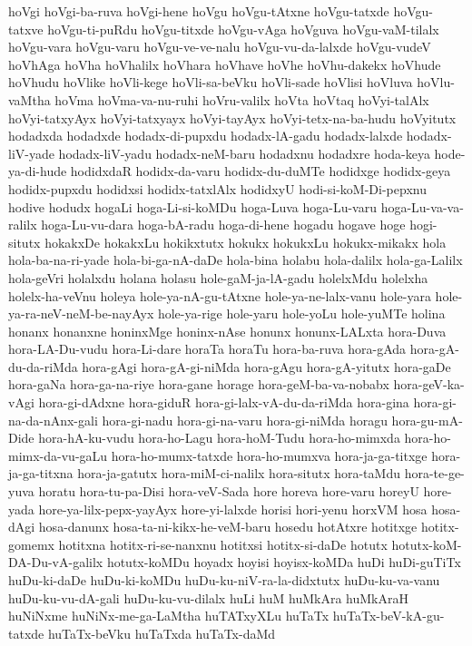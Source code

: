 {hoVgi
hoVgi-ba-ruva
hoVgi-hene
hoVgu
hoVgu-tAtxne
hoVgu-tatxde
hoVgu-tatxve
hoVgu-ti-puRdu
hoVgu-titxde
hoVgu-vAga
hoVguva
hoVgu-vaM-tilalx
hoVgu-vara
hoVgu-varu
hoVgu-ve-ve-nalu
hoVgu-vu-da-lalxde
hoVgu-vudeV
hoVhAga
hoVha
hoVhalilx
hoVhara
hoVhave
hoVhe
hoVhu-dakekx
hoVhude
hoVhudu
hoVlike
hoVli-kege
hoVli-sa-beVku
hoVli-sade
hoVlisi
hoVluva
hoVlu-vaMtha
hoVma
hoVma-va-nu-ruhi
hoVru-valilx
hoVta
hoVtaq
hoVyi-talAlx
hoVyi-tatxyAyx
hoVyi-tatxyayx
hoVyi-tayAyx
hoVyi-tetx-na-ba-hudu
hoVyitutx
hodadxda
hodadxde
hodadx-di-pupxdu
hodadx-lA-gadu
hodadx-lalxde
hodadx-liV-yade
hodadx-liV-yadu
hodadx-neM-baru
hodadxnu
hodadxre
hoda-keya
hode-ya-di-hude
hodidxdaR
hodidx-da-varu
hodidx-du-duMTe
hodidxge
hodidx-geya
hodidx-pupxdu
hodidxsi
hodidx-tatxlAlx
hodidxyU
hodi-si-koM-Di-pepxnu
hodive
hodudx
hogaLi
hoga-Li-si-koMDu
hoga-Luva
hoga-Lu-varu
hoga-Lu-va-va-ralilx
hoga-Lu-vu-dara
hoga-bA-radu
hoga-di-hene
hogadu
hogave
hoge
hogi-situtx
hokakxDe
hokakxLu
hokikxtutx
hokukx
hokukxLu
hokukx-mikakx
hola
hola-ba-na-ri-yade
hola-bi-ga-nA-daDe
hola-bina
holabu
hola-dalilx
hola-ga-Lalilx
hola-geVri
holalxdu
holana
holasu
hole-gaM-ja-lA-gadu
holelxMdu
holelxha
holelx-ha-veVnu
holeya
hole-ya-nA-gu-tAtxne
hole-ya-ne-lalx-vanu
hole-yara
hole-ya-ra-neV-neM-be-nayAyx
hole-ya-rige
hole-yaru
hole-yoLu
hole-yuMTe
holina
honanx
honanxne
honinxMge
honinx-nAse
honunx
honunx-LALxta
hora-Duva
hora-LA-Du-vudu
hora-Li-dare
horaTa
horaTu
hora-ba-ruva
hora-gAda
hora-gA-du-da-riMda
hora-gAgi
hora-gA-gi-niMda
hora-gAgu
hora-gA-yitutx
hora-gaDe
hora-gaNa
hora-ga-na-riye
hora-gane
horage
hora-geM-ba-va-nobabx
hora-geV-ka-vAgi
hora-gi-dAdxne
hora-giduR
hora-gi-lalx-vA-du-da-riMda
hora-gina
hora-gi-na-da-nAnx-gali
hora-gi-nadu
hora-gi-na-varu
hora-gi-niMda
horagu
hora-gu-mA-Dide
hora-hA-ku-vudu
hora-ho-Lagu
hora-hoM-Tudu
hora-ho-mimxda
hora-ho-mimx-da-vu-gaLu
hora-ho-mumx-tatxde
hora-ho-mumxva
hora-ja-ga-titxge
hora-ja-ga-titxna
hora-ja-gatutx
hora-miM-ci-nalilx
hora-situtx
hora-taMdu
hora-te-ge-yuva
horatu
hora-tu-pa-Disi
hora-veV-Sada
hore
horeva
hore-varu
horeyU
hore-yada
hore-ya-lilx-pepx-yayAyx
hore-yi-lalxde
horisi
hori-yenu
horxVM
hosa
hosa-dAgi
hosa-danunx
hosa-ta-ni-kikx-he-veM-baru
hosedu
hotAtxre
hotitxge
hotitx-gomemx
hotitxna
hotitx-ri-se-nanxnu
hotitxsi
hotitx-si-daDe
hotutx
hotutx-koM-DA-Du-vA-galilx
hotutx-koMDu
hoyadx
hoyisi
hoyisx-koMDa
huDi
huDi-guTiTx
huDu-ki-daDe
huDu-ki-koMDu
huDu-ku-niV-ra-la-didxtutx
huDu-ku-va-vanu
huDu-ku-vu-dA-gali
huDu-ku-vu-dilalx
huLi
huM
huMkAra
huMkAraH
huNiNxme
huNiNx-me-ga-LaMtha
huTATxyXLu
huTaTx
huTaTx-beV-kA-gu-tatxde
huTaTx-beVku
huTaTxda
huTaTx-daMd
}
